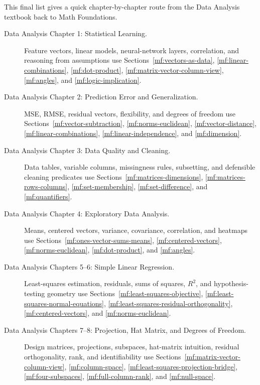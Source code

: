 This final list gives a quick chapter-by-chapter route from the Data Analysis textbook back to Math Foundations.

\begin{description}
    \item[Data Analysis Chapter 1: Statistical Learning.] Feature vectors, linear models, neural-network layers, correlation, and reasoning from assumptions use Sections~\ref{mf:vectors-as-data}, \ref{mf:linear-combinations}, \ref{mf:dot-product}, \ref{mf:matrix-vector-column-view}, \ref{mf:angles}, and \ref{mf:logic-implication}.

    \item[Data Analysis Chapter 2: Prediction Error and Generalization.] MSE, RMSE, residual vectors, flexibility, and degrees of freedom use Sections~\ref{mf:vector-subtraction}, \ref{mf:norms-euclidean}, \ref{mf:vector-distance}, \ref{mf:linear-combinations}, \ref{mf:linear-independence}, and \ref{mf:dimension}.

    \item[Data Analysis Chapter 3: Data Quality and Cleaning.] Data tables, variable columns, missingness rules, subsetting, and defensible cleaning predicates use Sections~\ref{mf:matrices-dimensions}, \ref{mf:matrices-rows-columns}, \ref{mf:set-membership}, \ref{mf:set-difference}, and \ref{mf:quantifiers}.

    \item[Data Analysis Chapter 4: Exploratory Data Analysis.] Means, centered vectors, variance, covariance, correlation, and heatmaps use Sections~\ref{mf:ones-vector-sums-means}, \ref{mf:centered-vectors}, \ref{mf:norms-euclidean}, \ref{mf:dot-product}, and \ref{mf:angles}.

    \item[Data Analysis Chapters 5--6: Simple Linear Regression.] Least-squares estimation, residuals, sums of squares, \(R^2\), and hypothesis-testing geometry use Sections~\ref{mf:least-squares-objective}, \ref{mf:least-squares-normal-equations}, \ref{mf:least-squares-residual-orthogonality}, \ref{mf:centered-vectors}, and \ref{mf:norms-euclidean}.

    \item[Data Analysis Chapters 7--8: Projection, Hat Matrix, and Degrees of Freedom.] Design matrices, projections, subspaces, hat-matrix intuition, residual orthogonality, rank, and identifiability use Sections~\ref{mf:matrix-vector-column-view}, \ref{mf:column-space}, \ref{mf:least-squares-projection-bridge}, \ref{mf:four-subspaces}, \ref{mf:full-column-rank}, and \ref{mf:null-space}.


\end{description}
